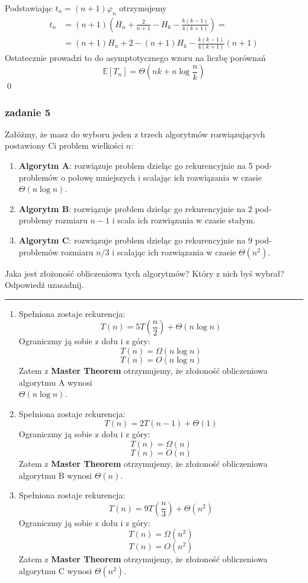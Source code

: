 \documentclass[11pt,a4paper]{article}
\begin{document}
Podstawiając $t_n = (n+1) \varphi_n$ otrzymujemy
\begin{equation*}\begin{aligned}
    t_n &= (n+1) \left( H_{n} + \frac{2}{n+1} -  H_{k} - \frac{k(k-1)}{4(k+1)} \right) = \\
        &= (n+1) H_{n} + 2 - (n+1) H_{k} - \frac{k(k-1)}{4(k+1)}(n+1)
\end{aligned}\end{equation*}
Ostatecznie prowadzi to do asymptotycznego wzoru na liczbę porównań
\[
    \mathbb{E}[T_n] = \Theta\left(nk + n \log \frac{n}{k}\right)
\]
\qed



\subsubsection{zadanie 5}
Załóżmy, że masz do wyboru jeden z trzech algorytmów rozwiązujących postawiony Ci problem wielkości $n$:
\begin{enumerate}
  \item \textbf{Algorytm A}: rozwiązuje problem dzieląc go rekurencyjnie na 5 pod-problemów o połowę mniejszych i scalając ich rozwiązania w czasie $\Theta(n \log n)$.
  \item \textbf{Algorytm B}: rozwiązuje problem dzieląc go rekurencyjnie na 2 pod-problemy rozmiaru $n - 1$ i scala ich rozwiązania w czasie stałym.
  \item \textbf{Algorytm C}: rozwiązuje problem dzieląc go rekurencyjnie na 9 pod-problemów rozmiaru $n/3$ i scalając ich rozwiązania w czasie $\Theta(n^2)$.
\end{enumerate}

Jaka jest złożoność obliczeniowa tych algorytmów? Który z nich byś wybrał? Odpowiedź uzasadnij.

\bigskip
\hrule
\bigskip


\begin{enumerate}
    \item Spełniona zostaje rekurencja:
        \[
            T(n) = 5T\left(\frac{n}{2}\right) + \Theta(n\log n)
        \]
        Ograniczmy ją sobie z dołu i z góry:
        \[
            T(n) = \Omega(n\log n)
        \]
        \[
            T(n) = O(n\log n)
        \]
        Zatem z \textbf{Master Theorem} otrzymujemy, że złożoność obliczeniowa algorytmu A wynosi \\$\Theta(n\log n)$.
    \item Spełniona zostaje rekurencja:
        \[
            T(n) = 2T(n-1) + \Theta(1)
        \]
        Ograniczmy ją sobie z dołu i z góry:
        \[
            T(n) = \Omega(n)
        \]
        \[
            T(n) = O(n)
        \]
        Zatem z \textbf{Master Theorem} otrzymujemy, że złożoność obliczeniowa algorytmu B wynosi $\Theta(n)$.
    \item Spełniona zostaje rekurencja:
        \[
            T(n) = 9T\left(\frac{n}{3}\right) + \Theta(n^2)
        \]
        Ograniczmy ją sobie z dołu i z góry:
        \[
            T(n) = \Omega(n^2)
        \]
        \[
            T(n) = O(n^2)
        \]
        Zatem z \textbf{Master Theorem} otrzymujemy, że złożoność obliczeniowa algorytmu C wynosi $\Theta(n^2)$.
\end{enumerate}
\end{document}

